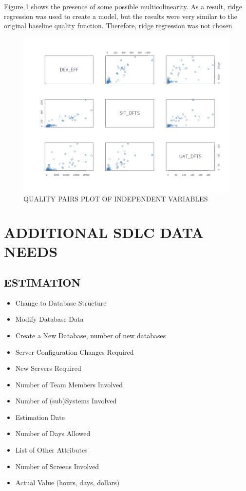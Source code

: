 \documentclass[SDSUThesis.tex]{subfiles}
\begin{document}
        Figure \ref{fig:quality-pairs} shows the presence of some
        possible multicolinearity.  As a result, ridge regression
        was used to create a model, but the results were very similar
        to the original baseline quality function. Therefore,
        ridge regression was not chosen. 
        \begin{figure}[ht]
            \centering
            \includegraphics[scale=.3]{images/quality_pairs.png}
            \caption{QUALITY PAIRS PLOT OF INDEPENDENT VARIABLES}
            \label{fig:quality-pairs}
        \end{figure}
        
        
    


\section{ADDITIONAL SDLC DATA NEEDS}

    \subsection{ESTIMATION}
    
    \begin{itemize}
    \item Change to Database Structure  
    \item Modify Database Data    
    \item Create a New Database, number of new databases  
    \item Server Configuration Changes Required   
    \item New Servers Required   
    \item Number of Team Members Involved  
    \item Number of (sub)Systems Involved  
    \item Estimation Date
    \item Number of Days Allowed
    \item List of Other Attributes
    \item Number of Screens Involved 
    \item Actual Value (hours, days, dollars) 
    \end{itemize}
    
\end{document}
